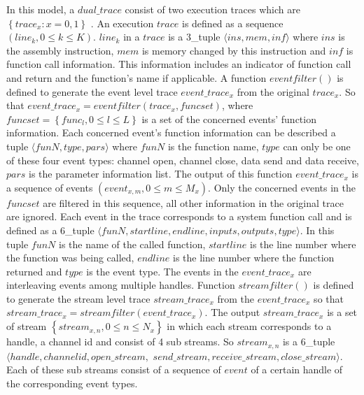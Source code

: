 In this model, a $dual\_trace$ consist of two execution traces which are $\left\lbrace trace_{x}: x= 0,1 \right\rbrace $ . An execution $trace$ is defined as a sequence $(line_{k}, 0 \leqslant k \leqslant K)$. $line_{k}$ in a $trace$ is a 3\_tuple $\langle ins, mem, inf \rangle$ where $ins$ is the assembly instruction, $mem$ is memory changed by this instruction and $inf$ is function call information. This information includes an indicator of function call and return and the function's name if applicable. A function $eventfilter \left( \right) $ is defined to generate the event level trace $event\_trace_{x}$ from the original $trace_{x}$. So that $event\_trace_{x} = eventfilter\left( trace_{x}, funcset\right) $, where $funcset = \left \lbrace func_{l}, 0 \leqslant l \leqslant L\right\rbrace $ is a set of the concerned events' function information. Each concerned event's function information can be described a tuple $\langle funN, type, pars \rangle$ where $funN$ is the function name, $type$ can only be one of these four event types: channel open, channel close, data send and data receive, $pars$ is the parameter information list. The output of this function $event\_trace_{x}$ is a sequence of events $(event_{x,m}, 0 \leqslant m \leqslant M_{x})$. Only the concerned events in the $funcset$ are filtered in this sequence, all other information in the original trace are ignored. Each event in the trace corresponds to a system function call and is defined as a 6\_tuple $\langle funN, startline, endline, inputs, outputs, type \rangle$. In this tuple $funN$ is the name of the called function, $startline$ is the line number where the function was being called, $endline$ is the line number where the function returned and $type$ is the event type. The events in the $event\_trace_{x}$ are interleaving events among multiple handles. Function  $streamfilter \left( \right) $ is defined to generate the stream level trace $stream\_trace_{x}$ from the $event\_trace_{x}$ so that $stream\_trace_{x} = streamfilter\left( event\_trace_{x} \right) $. The output $stream\_trace_{x}$ is a set of stream $\left \lbrace stream_{x,n}, 0 \leqslant n \leqslant N_{x}\right\rbrace$ in which each stream corresponds to a handle, a channel id and consist of 4 sub streams. So $stream_{x,n} $ is a 6\_tuple $\langle handle, channelid, open\_stream,$ $ send\_stream, receive\_stream, close\_stream \rangle $. Each of these sub streams consist of a sequence of $event$ of a certain handle of the corresponding event types.

